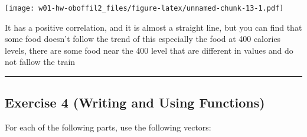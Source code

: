 \documentclass[]{article}
\newenvironment{Shaded}{\begin{snugshade}}{\end{snugshade}}
\newcommand{\DataTypeTok}[1]{\textcolor[rgb]{0.13,0.29,0.53}{#1}}
\newcommand{\DecValTok}[1]{\textcolor[rgb]{0.00,0.00,0.81}{#1}}
\newcommand{\KeywordTok}[1]{\textcolor[rgb]{0.13,0.29,0.53}{\textbf{#1}}}
\newcommand{\NormalTok}[1]{#1}
\newcommand{\OperatorTok}[1]{\textcolor[rgb]{0.81,0.36,0.00}{\textbf{#1}}}
\newcommand{\StringTok}[1]{\textcolor[rgb]{0.31,0.60,0.02}{#1}}
\begin{document}
\begin{Shaded}
\end{Shaded}

\texttt{[image: w01-hw-oboffil2\_files/figure-latex/unnamed-chunk-13-1.pdf]}

It has a positive correlation, and it is almost a straight line, but you
can find that some food doesn't follow the trend of this especially the
food at 400 calories levels, there are some food near the 400 level that
are different in values and do not fallow the train

\begin{center}\rule{0.5\linewidth}{0.5pt}\end{center}

\hypertarget{exercise-4-writing-and-using-functions}{%
\subsection{Exercise 4 (Writing and Using
Functions)}\label{exercise-4-writing-and-using-functions}}

For each of the following parts, use the following vectors:
\end{document}
